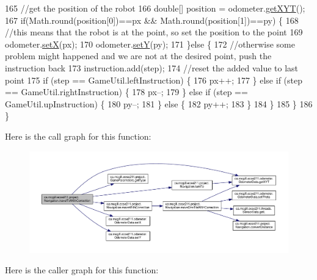 \begin{DoxyCode}
165       \textcolor{comment}{//get the position of the robot}
166       \textcolor{keywordtype}{double}[] position = odometer.\hyperlink{classca_1_1mcgill_1_1ecse211_1_1odometer_1_1_odometer_data_a8f40f0264c68f0cbed4fff1723ae7863}{getXYT}();
167       \textcolor{keywordflow}{if}(Math.round(position[0])==px && Math.round(position[1])==py) \{
168         \textcolor{comment}{//this means that the robot is at the point, so set the position to the point}
169         odometer.\hyperlink{classca_1_1mcgill_1_1ecse211_1_1odometer_1_1_odometer_data_a2911d7215e47f3064defe016b46bfeef}{setX}(px);
170         odometer.\hyperlink{classca_1_1mcgill_1_1ecse211_1_1odometer_1_1_odometer_data_a82986438cd462e66520bc62bb4bd2b75}{setY}(py);
171       \}\textcolor{keywordflow}{else} \{
172         \textcolor{comment}{//otherwise some problem might happened and we are not at the desired point, push the instruction
       back}
173         instruction.add(step);
174         \textcolor{comment}{//reset the added value to last point}
175         \textcolor{keywordflow}{if} (step == GameUtil.leftInstruction) \{
176           px++;
177         \} \textcolor{keywordflow}{else} \textcolor{keywordflow}{if} (step == GameUtil.rightInstruction) \{
178           px--;
179         \} \textcolor{keywordflow}{else} \textcolor{keywordflow}{if} (step == GameUtil.upInstruction) \{
180           py--;
181         \} \textcolor{keywordflow}{else} \{
182           py++;
183         \}
184       \}
185     \}
186   \}
\end{DoxyCode}
Here is the call graph for this function\+:
\nopagebreak
\begin{figure}[H]
\begin{center}
\leavevmode
\includegraphics[width=350pt]{classca_1_1mcgill_1_1ecse211_1_1project_1_1_navigation_ae7230e905494002087416294f12cae6a_cgraph}
\end{center}
\end{figure}
Here is the caller graph for this function\+:
\nopagebreak
